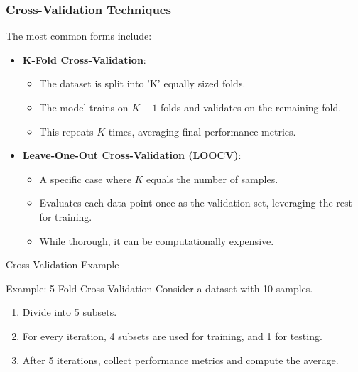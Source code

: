 \documentclass[aspectratio=169]{beamer}
\begin{document}
\begin{frame}[fragile]
    \frametitle{Cross-Validation Techniques}
    The most common forms include:

    \begin{itemize}
        \item \textbf{K-Fold Cross-Validation}:
        \begin{itemize}
            \item The dataset is split into 'K' equally sized folds.
            \item The model trains on \(K-1\) folds and validates on the remaining fold.
            \item This repeats \(K\) times, averaging final performance metrics.
        \end{itemize}

        \item \textbf{Leave-One-Out Cross-Validation (LOOCV)}:
        \begin{itemize}
            \item A specific case where \(K\) equals the number of samples.
            \item Evaluates each data point once as the validation set, leveraging the rest for training.
            \item While thorough, it can be computationally expensive.
        \end{itemize}
    \end{itemize}
\end{frame}

\begin{frame}[fragile]{Cross-Validation Example}
    \begin{block}{Example: 5-Fold Cross-Validation}
        Consider a dataset with 10 samples.
        \begin{enumerate}
            \item Divide into 5 subsets.
            \item For every iteration, 4 subsets are used for training, and 1 for testing.
            \item After 5 iterations, collect performance metrics and compute the average.
        \end{enumerate}
    \end{block}
\end{frame}
\end{document}
